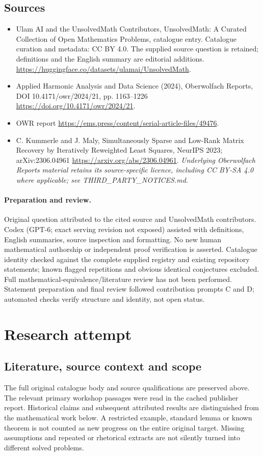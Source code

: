 \documentclass[11pt]{article}
\begin{document}
\subsection{Sources}
\begin{itemize}
\item[S1] Ulam AI and the UnsolvedMath Contributors, UnsolvedMath: A Curated Collection of Open Mathematics Problems, catalogue entry. Catalogue curation and metadata: CC BY 4.0. The supplied source question is retained; definitions and the English summary are editorial additions.
\url{https://huggingface.co/datasets/ulamai/UnsolvedMath}.
\item[S2] Applied Harmonic Analysis and Data Science (2024), Oberwolfach Reports, DOI 10.4171/owr/2024/21, pp. 1163--1226
\url{https://doi.org/10.4171/owr/2024/21}.
\item[S3] OWR report
\url{https://ems.press/content/serial-article-files/49476}.
\item[S4] C. Kummerle and J. Maly, Simultaneously Sparse and Low-Rank Matrix Recovery by Iteratively Reweighted Least Squares, NeurIPS 2023; arXiv:2306.04961
\url{https://arxiv.org/abs/2306.04961}.
\textit{Underlying Oberwolfach Reports material retains its source-specific licence, including CC BY-SA 4.0 where applicable; see THIRD\_PARTY\_NOTICES.md.}
\end{itemize}
\paragraph{Preparation and review.}
Original question attributed to the cited source and UnsolvedMath contributors. Codex (GPT-6; exact serving revision not exposed) assisted with definitions, English summaries, source inspection and formatting. No new human mathematical authorship or independent proof verification is asserted. Catalogue identity checked against the complete supplied registry and existing repository statements; known flagged repetitions and obvious identical conjectures excluded. Full mathematical-equivalence/literature review has not been performed. Statement preparation and final review followed contribution prompts C and D; automated checks verify structure and identity, not open status.
\label{end:statement}

\section{Research attempt}
\subsection{Literature, source context and scope}
The full original catalogue body and source qualifications are preserved above. The relevant primary workshop passages were read in the cached publisher report. Historical claims and subsequent attributed results are distinguished from the mathematical work below. A restricted example, standard lemma or known theorem is not counted as new progress on the entire original target. Missing assumptions and repeated or rhetorical extracts are not silently turned into different solved problems.
\end{document}
